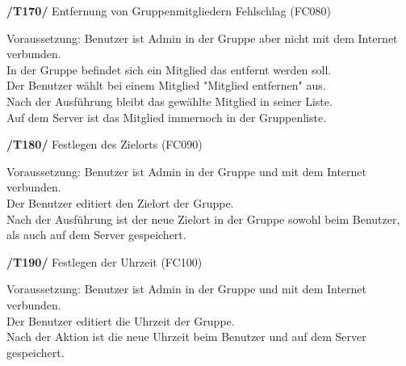 \textbf{/T170/} Entfernung von Gruppenmitgliedern Fehlschlag (FC080)\\
\begin{center}
\vspace{-\parskip}
\begin{minipage}[t]{0.9\textwidth}
Voraussetzung: Benutzer ist Admin in der Gruppe aber nicht mit dem Internet verbunden.\\
In der Gruppe befindet sich ein Mitglied das entfernt werden soll.\\
Der Benutzer wählt bei einem Mitglied "Mitglied entfernen" aus.    \\
Nach der Ausführung bleibt das gewählte Mitglied in seiner Liste.   \\
Auf dem Server ist das Mitglied immernoch in der Gruppenliste.       \\
\end{minipage}
\end{center}

\textbf{/T180/} Festlegen des Zielorts (FC090)\\
\begin{center}
\vspace{-\parskip}
\begin{minipage}[t]{0.9\textwidth}
Voraussetzung: Benutzer ist Admin in der Gruppe und mit dem Internet verbunden.\\
Der Benutzer editiert den Zielort der Gruppe.                                   \\
Nach der Ausführung ist der neue Zielort in der Gruppe sowohl beim Benutzer,     \\
als auch auf dem Server gespeichert.                                              \\
\end{minipage}
\end{center}

\textbf{/T190/} Festlegen der Uhrzeit (FC100)\\
\begin{center}
\vspace{-\parskip}
\begin{minipage}[t]{0.9\textwidth}
Voraussetzung: Benutzer ist Admin in der Gruppe und mit dem Internet verbunden.    \\
Der Benutzer editiert die Uhrzeit der Gruppe.                                       \\
Nach der Aktion ist die neue Uhrzeit beim Benutzer und auf dem Server gespeichert.   \\
\end{minipage}
\end{center}


